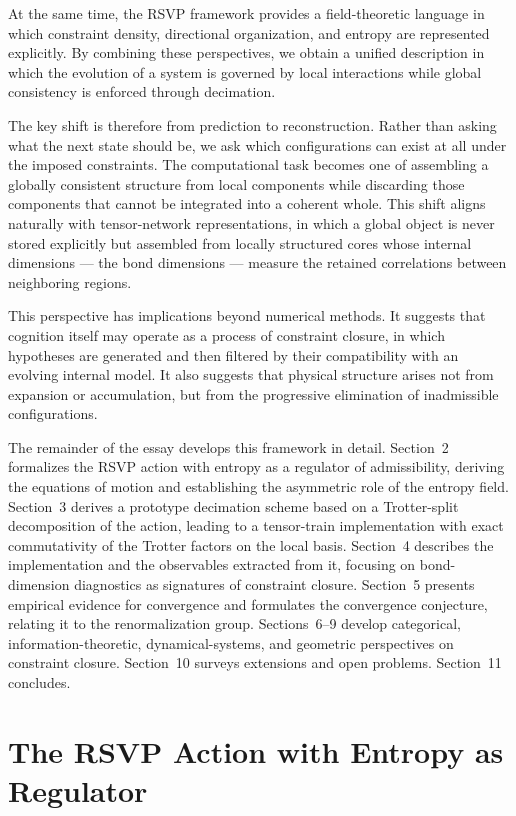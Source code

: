 \documentclass[11pt]{article}
\theoremstyle{definition}
\begin{document}
At the same time, the RSVP framework provides a field-theoretic language in
which constraint density, directional organization, and entropy are represented
explicitly. By combining these perspectives, we obtain a unified description in
which the evolution of a system is governed by local interactions while global
consistency is enforced through decimation.

The key shift is therefore from prediction to reconstruction. Rather than asking
what the next state should be, we ask which configurations can exist at all
under the imposed constraints. The computational task becomes one of assembling
a globally consistent structure from local components while discarding those
components that cannot be integrated into a coherent whole. This shift aligns
naturally with tensor-network representations, in which a global object is
never stored explicitly but assembled from locally structured cores whose
internal dimensions --- the bond dimensions --- measure the retained
correlations between neighboring regions.

This perspective has implications beyond numerical methods. It suggests that
cognition itself may operate as a process of constraint closure, in which
hypotheses are generated and then filtered by their compatibility with an
evolving internal model. It also suggests that physical structure arises not
from expansion or accumulation, but from the progressive elimination of
inadmissible configurations.

The remainder of the essay develops this framework in detail. Section~2
formalizes the RSVP action with entropy as a regulator of admissibility,
deriving the equations of motion and establishing the asymmetric role of the
entropy field. Section~3 derives a prototype decimation scheme based on a
Trotter-split decomposition of the action, leading to a tensor-train
implementation with exact commutativity of the Trotter factors on the
local basis. Section~4 describes the implementation and the observables
extracted from it, focusing on bond-dimension diagnostics as signatures
of constraint closure. Section~5 presents empirical evidence for convergence
and formulates the convergence conjecture, relating it to the renormalization
group. Sections~6--9 develop categorical, information-theoretic, dynamical-systems, and geometric perspectives on constraint closure. Section~10 surveys extensions and open problems. Section~11 concludes.

\section{The RSVP Action with Entropy as Regulator}
\end{document}
